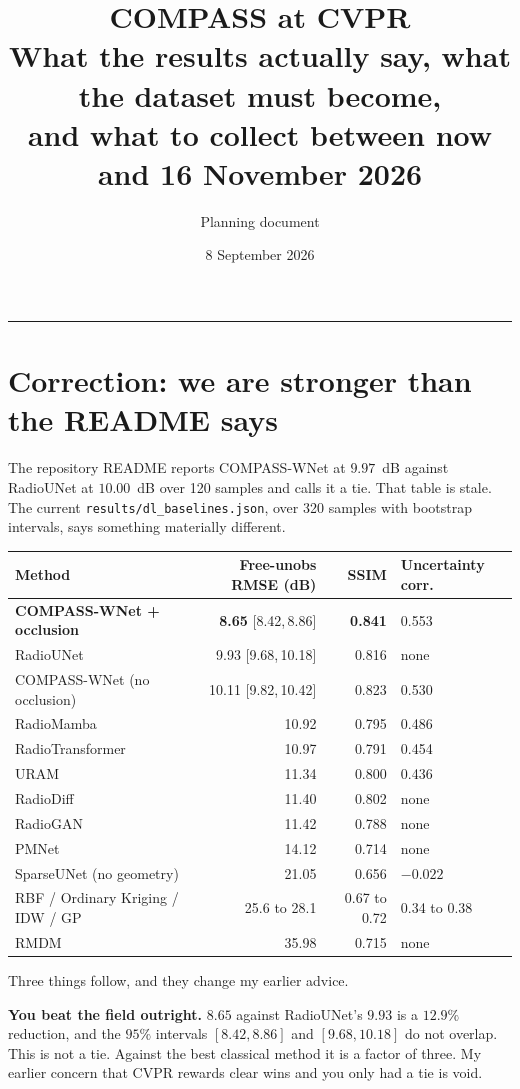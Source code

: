 \documentclass[11pt,a4paper]{article}
\title{\vspace{-1.5cm}\textbf{COMPASS at CVPR}\\[2mm]
\large What the results actually say, what the dataset must become,\\and what to collect between now and 16 November 2026}
\author{Planning document}
\date{8 September 2026}
\begin{document}
\maketitle
\vspace{-6mm}
\hrule
\vspace{4mm}

\section{Correction: we are stronger than the README says}

The repository README reports COMPASS-WNet at $9.97$~dB against RadioUNet at $10.00$~dB
over 120 samples and calls it a tie. That table is stale. The current
\texttt{results/dl\_baselines.json}, over 320 samples with bootstrap intervals, says
something materially different.

\begin{center}
\small
\begin{tabular}{lrrl}
\toprule
Method & Free-unobs RMSE (dB) & SSIM & Uncertainty corr. \\
\midrule
\rowcolor{green!8}\textbf{COMPASS-WNet + occlusion} & \textbf{8.65} \small[8.42,\,8.86] & \textbf{0.841} & 0.553 \\
RadioUNet & 9.93 \small[9.68,\,10.18] & 0.816 & none \\
COMPASS-WNet (no occlusion) & 10.11 \small[9.82,\,10.42] & 0.823 & 0.530 \\
RadioMamba & 10.92 & 0.795 & 0.486 \\
RadioTransformer & 10.97 & 0.791 & 0.454 \\
URAM & 11.34 & 0.800 & 0.436 \\
RadioDiff & 11.40 & 0.802 & none \\
RadioGAN & 11.42 & 0.788 & none \\
PMNet & 14.12 & 0.714 & none \\
SparseUNet (no geometry) & 21.05 & 0.656 & $-0.022$ \\
RBF / Ordinary Kriging / IDW / GP & 25.6 to 28.1 & 0.67 to 0.72 & 0.34 to 0.38 \\
RMDM & 35.98 & 0.715 & none \\
\bottomrule
\end{tabular}
\end{center}

Three things follow, and they change my earlier advice.

\textbf{You beat the field outright.} $8.65$ against RadioUNet's $9.93$ is a $12.9\%$
reduction, and the $95\%$ intervals $[8.42, 8.86]$ and $[9.68, 10.18]$ do not overlap.
This is not a tie. Against the best classical method it is a factor of three. My earlier
concern that CVPR rewards clear wins and you only had a tie is void.
\end{document}
